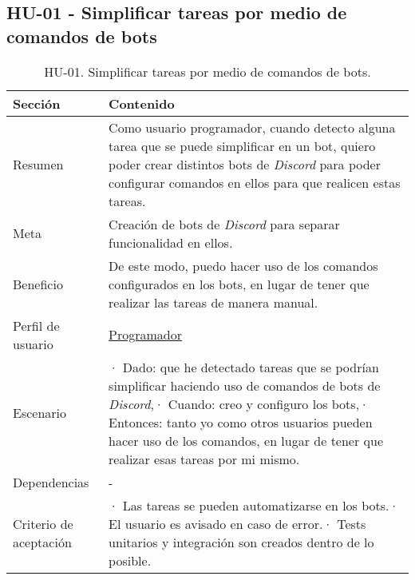 \subsection{HU-01 - Simplificar tareas por medio de comandos de bots}
\label{sec:hu01}

\begin{table}[H]
    \centering
    \def\arraystretch{1.25}
    \begin{adjustbox}{max width=\textwidth}
    \begin{tabularx}{\textwidth}{|l|L|}
    \hline
        \textbf{Sección} & \textbf{Contenido} \\ \hline
    \hline
        Resumen & Como usuario programador, cuando detecto alguna tarea que se puede simplificar en un bot, quiero poder crear distintos bots de \textit{Discord} para poder configurar comandos en ellos para que realicen estas tareas. \\ \hline
        Meta & Creación de bots de \textit{Discord} para separar funcionalidad en ellos. \\ \hline
        Beneficio & De este modo, puedo hacer uso de los comandos configurados en los bots, en lugar de tener que realizar las tareas de manera manual. \\ \hline
        Perfil de usuario & \hyperref[sec:personaProgramador]{Programador} \\ \hline
        Escenario & · Dado: que he detectado tareas que se podrían simplificar haciendo uso de comandos de bots de \textit{Discord},\linebreak · Cuando: creo y configuro los bots,\linebreak · Entonces: tanto yo como otros usuarios pueden hacer uso de los comandos, en lugar de tener que realizar esas tareas por mi mismo. \\ \hline
        Dependencias & - \\ \hline
        Criterio de aceptación & · Las tareas se pueden automatizarse en los bots.\linebreak · El usuario es avisado en caso de error.\linebreak · Tests unitarios y integración son creados dentro de lo posible. \\ \hline
    \end{tabularx}
    \end{adjustbox}
    \caption{HU-01. Simplificar tareas por medio de comandos de bots.}
\end{table}

\pagebreak

